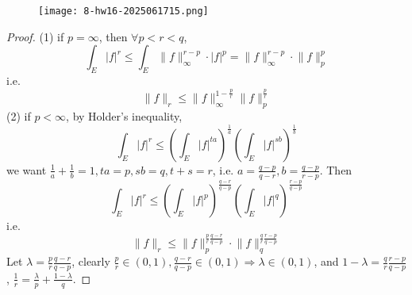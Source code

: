 \begin{exercise}
\begin{figure}[H]
\centering
\texttt{[image: 8-hw16-2025061715.png]}
\label{}
\end{figure}
\end{exercise}
\begin{proof}
(1) if $p=\infty$, then $\forall p<r<q$,
\[
\int_{E}\lvert f \rvert ^{r}\leq \int_{E}\lVert f \rVert _{\infty}^{r-p}\cdot \lvert f \rvert ^{p}=\lVert f \rVert _{\infty}^{r-p}\cdot \lVert f \rVert _{p}^{p}
\]
i.e.
\[
\lVert f \rVert _{r}\leq \lVert f \rVert _{\infty}^{1-\frac{p}{r}}\lVert f \rVert _{p}^{\frac{p}{r}}
\]
(2) if $p<\infty$, by Holder's inequality,
\[
\int_{E}^{} \lvert f \rvert ^{r}\leq \left( \int_{E}^{} \lvert f \rvert ^{ta} \right)^{\frac{1}{a}}\left( \int_{E}^{} \lvert f \rvert ^{sb} \right)^{\frac{1}{b}}
\]
we want $\frac{1}{a}+\frac{1}{b}=1,ta=p,sb=q,t+s=r$, i.e. $a=\frac{q-p}{q-r},b=\frac{q-p}{r-p}$. Then
\[
\int_{E}^{} \lvert f \rvert ^{r}\leq \left( \int_{E}^{} \lvert f \rvert ^{p} \right)^{\frac{q-r}{q-p}}\left( \int_{E}^{} \lvert f \rvert ^{q} \right)^{\frac{r-p}{q-p}}
\]
i.e.
\[
\lVert f \rVert _{r}\leq \lVert f \rVert _{p}^{\frac{p}{r}\frac{q-r}{q-p}}\cdot \lVert f \rVert_{q}^{\frac{q}{r}\frac{r-p}{q-p}}
\]
Let $\lambda=\frac{p}{r}\frac{q-r}{q-p}$, clearly $\frac{p}{r}\in (0,1),\frac{q-r}{q-p}\in (0,1)\Rightarrow\lambda\in(0,1)$, and $1-\lambda=\frac{q}{r}\frac{r-p}{q-p}$, $\frac{1}{r}=\frac{\lambda}{p}+\frac{1-\lambda}{q}$.
\end{proof}

